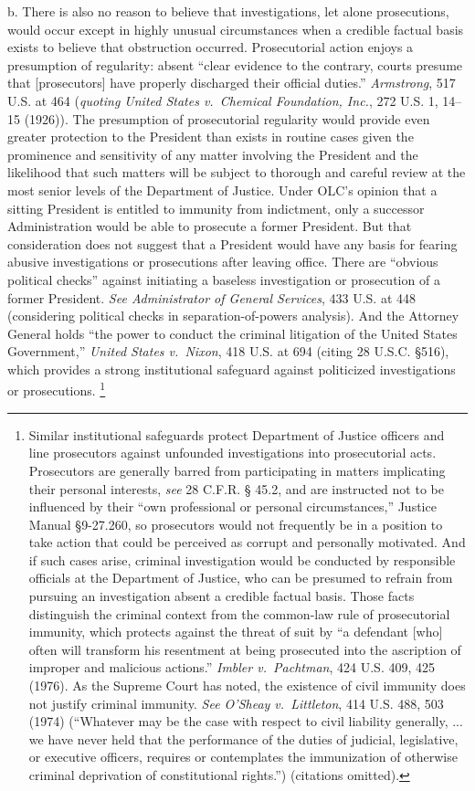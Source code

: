 b. There is also no reason to believe that investigations, let alone prosecutions, would occur except in highly unusual circumstances when a credible factual basis exists to believe that obstruction occurred.
Prosecutorial action enjoys a presumption of regularity: absent “clear evidence to the contrary, courts presume that [prosecutors] have properly discharged their official duties.”
\textit{Armstrong}, 517 U.S. at 464 (\textit{quoting United States v.\ Chemical Foundation, Inc.}, 272 U.S. 1, 14--15 (1926)).
The presumption of prosecutorial regularity would provide even greater protection to the President than exists in routine cases given the prominence and sensitivity of any matter involving the President and the likelihood that such matters will be subject to thorough and careful review at the most senior levels of the Department of Justice.
Under OLC’s opinion that a sitting President is entitled to immunity from indictment, only a successor Administration would be able to prosecute a former President.
But that consideration does not suggest that a President would have any basis for fearing abusive investigations or prosecutions after leaving office.
There are “obvious political checks” against initiating a baseless investigation or prosecution of a former President.
\textit{See Administrator of General Services}, 433 U.S. at 448 (considering political checks in separation-of-powers analysis).
And the Attorney General holds “the power to conduct the criminal litigation of the United States Government,” \textit{United States v.\ Nixon}, 418 U.S. at 694 (citing 28 U.S.C. \S 516), which provides a strong institutional safeguard against politicized investigations or prosecutions.%
\footnote{Similar institutional safeguards protect Department of Justice officers and line prosecutors against unfounded investigations into prosecutorial acts.
Prosecutors are generally barred from participating in matters implicating their personal interests, \textit{see} 28 C.F.R. § 45.2, and are instructed not to be influenced by their “own professional or personal circumstances,” Justice Manual \S 9-27.260, so prosecutors would not frequently be in a position to take action that could be perceived as corrupt and personally motivated.
And if such cases arise, criminal investigation would be conducted by responsible officials at the Department of Justice, who can be presumed to refrain from pursuing an investigation absent a credible factual basis.
Those facts distinguish the criminal context from the common-law rule of prosecutorial immunity, which protects against the threat of suit by “a defendant [who] often will transform his resentment at being prosecuted into the ascription of improper and malicious actions.”
\textit{Imbler v.\ Pachtman}, 424 U.S. 409, 425 (1976).
As the Supreme Court has noted, the existence of civil immunity does not justify criminal immunity.
\textit{See O'Sheay v.\ Littleton}, 414 U.S. 488, 503 (1974) (“Whatever may be the case with respect to civil liability generally, ... we have never held that the performance of the duties of judicial, legislative, or executive officers, requires or contemplates the immunization of otherwise criminal deprivation of constitutional rights.”) (citations omitted).}


